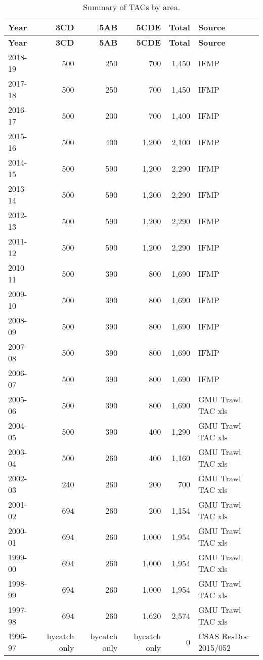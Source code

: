 \documentclass[11pt]{book}
\begin{document}
\begin{longtable}[]{@{}lrrrrl@{}}
\caption{\label{tab:tab-tac}Summary of TACs by area.}\tabularnewline
\toprule
\textbf{Year} & \textbf{3CD} & \textbf{5AB} & \textbf{5CDE} & \textbf{Total} & \textbf{Source}\tabularnewline
\midrule
\endfirsthead
\toprule
\textbf{Year} & \textbf{3CD} & \textbf{5AB} & \textbf{5CDE} & \textbf{Total} & \textbf{Source}\tabularnewline
\midrule
\endhead
2018-19 & 500 & 250 & 700 & 1,450 & IFMP\tabularnewline
2017-18 & 500 & 250 & 700 & 1,450 & IFMP\tabularnewline
2016-17 & 500 & 200 & 700 & 1,400 & IFMP\tabularnewline
2015-16 & 500 & 400 & 1,200 & 2,100 & IFMP\tabularnewline
2014-15 & 500 & 590 & 1,200 & 2,290 & IFMP\tabularnewline
2013-14 & 500 & 590 & 1,200 & 2,290 & IFMP\tabularnewline
2012-13 & 500 & 590 & 1,200 & 2,290 & IFMP\tabularnewline
2011-12 & 500 & 590 & 1,200 & 2,290 & IFMP\tabularnewline
2010-11 & 500 & 390 & 800 & 1,690 & IFMP\tabularnewline
2009-10 & 500 & 390 & 800 & 1,690 & IFMP\tabularnewline
2008-09 & 500 & 390 & 800 & 1,690 & IFMP\tabularnewline
2007-08 & 500 & 390 & 800 & 1,690 & IFMP\tabularnewline
2006-07 & 500 & 390 & 800 & 1,690 & IFMP\tabularnewline
2005-06 & 500 & 390 & 800 & 1,690 & GMU Trawl TAC xls\tabularnewline
2004-05 & 500 & 390 & 400 & 1,290 & GMU Trawl TAC xls\tabularnewline
2003-04 & 500 & 260 & 400 & 1,160 & GMU Trawl TAC xls\tabularnewline
2002-03 & 240 & 260 & 200 & 700 & GMU Trawl TAC xls\tabularnewline
2001-02 & 694 & 260 & 200 & 1,154 & GMU Trawl TAC xls\tabularnewline
2000-01 & 694 & 260 & 1,000 & 1,954 & GMU Trawl TAC xls\tabularnewline
1999-00 & 694 & 260 & 1,000 & 1,954 & GMU Trawl TAC xls\tabularnewline
1998-99 & 694 & 260 & 1,000 & 1,954 & GMU Trawl TAC xls\tabularnewline
1997-98 & 694 & 260 & 1,620 & 2,574 & GMU Trawl TAC xls\tabularnewline
1996-97 & bycatch only & bycatch only & bycatch only & 0 & CSAS ResDoc 2015/052\tabularnewline
\bottomrule
\end{longtable}
\clearpage
\end{document}
